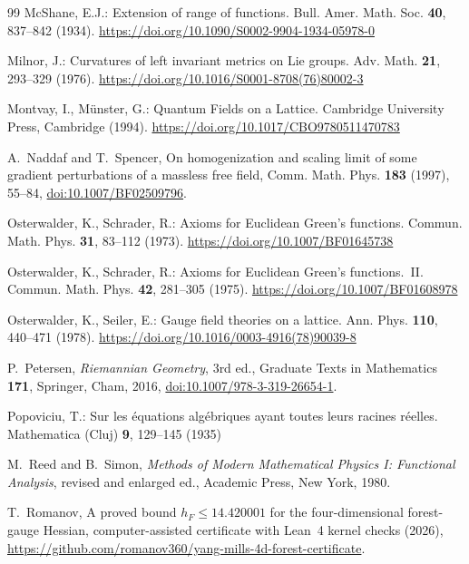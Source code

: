 \documentclass[11pt]{amsart}
\theoremstyle{definition}
\theoremstyle{remark}
\numberwithin{equation}{section}
\begin{document}
\begin{thebibliography}{99}
McShane, E.J.: Extension of range of functions. Bull. Amer. Math. Soc. \textbf{40}, 837--842 (1934). \href{https://doi.org/10.1090/S0002-9904-1934-05978-0}{https://doi.org/10.1090/S0002-9904-1934-05978-0}

Milnor, J.: Curvatures of left invariant metrics on Lie groups. Adv.
Math. \textbf{21}, 293--329 (1976).
\href{https://doi.org/10.1016/S0001-8708(76)80002-3}{https://doi.org/10.1016/S0001-8708(76)80002-3}

Montvay, I., M\"unster, G.: Quantum Fields on a Lattice. Cambridge
University Press, Cambridge (1994).
\href{https://doi.org/10.1017/CBO9780511470783}{https://doi.org/10.1017/CBO9780511470783}

A.~Naddaf and T.~Spencer, On homogenization and scaling limit of some
gradient perturbations of a massless free field, Comm. Math. Phys.
\textbf{183} (1997), 55--84,
\href{https://doi.org/10.1007/BF02509796}{doi:10.1007/BF02509796}.

Osterwalder, K., Schrader, R.: Axioms for Euclidean Green's functions.
Commun. Math. Phys. \textbf{31}, 83--112 (1973).
\href{https://doi.org/10.1007/BF01645738}{https://doi.org/10.1007/BF01645738}

Osterwalder, K., Schrader, R.: Axioms for Euclidean Green's functions.~II.
Commun. Math. Phys. \textbf{42}, 281--305 (1975).
\href{https://doi.org/10.1007/BF01608978}{https://doi.org/10.1007/BF01608978}

Osterwalder, K., Seiler, E.: Gauge field theories on a lattice. Ann. Phys.
\textbf{110}, 440--471 (1978).
\href{https://doi.org/10.1016/0003-4916(78)90039-8}{https://doi.org/10.1016/0003-4916(78)90039-8}

P.~Petersen, \emph{Riemannian Geometry}, 3rd ed., Graduate Texts in
Mathematics \textbf{171}, Springer, Cham, 2016,
\href{https://doi.org/10.1007/978-3-319-26654-1}{doi:10.1007/978-3-319-26654-1}.

Popoviciu, T.: Sur les \'equations alg\'ebriques ayant toutes leurs racines r\'eelles. Mathematica (Cluj) \textbf{9}, 129--145 (1935)

M.~Reed and B.~Simon, \emph{Methods of Modern Mathematical Physics I:
Functional Analysis}, revised and enlarged ed., Academic Press, New York,
1980.

T.~Romanov, A proved bound $h_F\le14.420001$ for the four-dimensional
forest-gauge Hessian, computer-assisted certificate with Lean~4 kernel
checks (2026),
\url{https://github.com/romanov360/yang-mills-4d-forest-certificate}.


\end{thebibliography}
\end{document}
